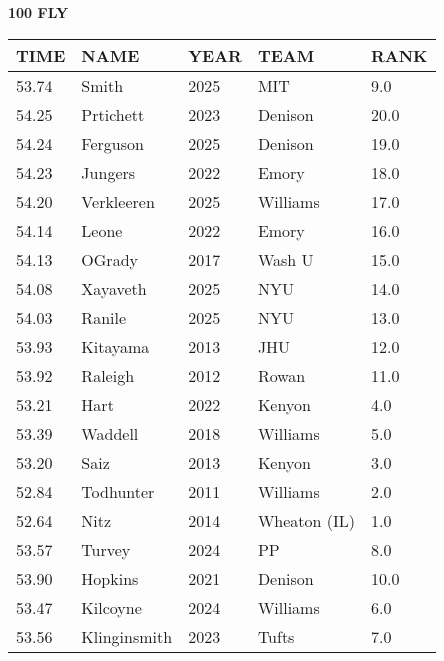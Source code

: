 \begin{minipage}[t]{0.48\textwidth}
\centering
\textbf{100 FLY}\\[0.05cm]
\begin{tabular}{@{}p{1.8cm}p{2.8cm}p{1.2cm}p{1.4cm}p{0.8cm}@{}}
\hline
\textbf{TIME} & \textbf{NAME} & \textbf{YEAR} & \textbf{TEAM} & \textbf{RANK} \\
\hline
53.74 & Smith & 2025 & MIT & 9.0 \\
54.25 & Prtichett & 2023 & Denison & 20.0 \\
54.24 & Ferguson & 2025 & Denison & 19.0 \\
54.23 & Jungers & 2022 & Emory & 18.0 \\
54.20 & Verkleeren & 2025 & Williams & 17.0 \\
54.14 & Leone & 2022 & Emory & 16.0 \\
54.13 & OGrady & 2017 & Wash U & 15.0 \\
54.08 & Xayaveth & 2025 & NYU & 14.0 \\
54.03 & Ranile & 2025 & NYU & 13.0 \\
53.93 & Kitayama & 2013 & JHU & 12.0 \\
53.92 & Raleigh & 2012 & Rowan & 11.0 \\
53.21 & Hart & 2022 & Kenyon & 4.0 \\
53.39 & Waddell & 2018 & Williams & 5.0 \\
53.20 & Saiz & 2013 & Kenyon & 3.0 \\
52.84 & Todhunter & 2011 & Williams & 2.0 \\
52.64 & Nitz & 2014 & Wheaton (IL) & 1.0 \\
53.57 & Turvey & 2024 & PP & 8.0 \\
53.90 & Hopkins & 2021 & Denison & 10.0 \\
53.47 & Kilcoyne & 2024 & Williams & 6.0 \\
53.56 & Klinginsmith & 2023 & Tufts & 7.0 \\
\hline
\end{tabular}
\end{minipage}

\vspace{0.4cm}

